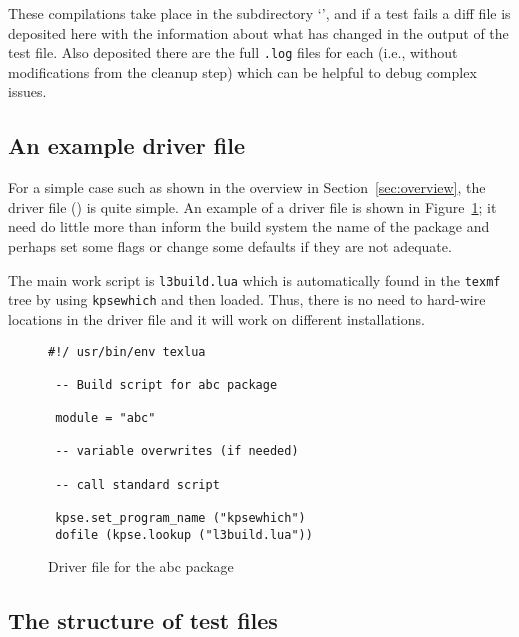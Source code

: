 \documentclass[a4paper]{ltugboat}
\begin{document}
These compilations take place in the subdirectory
`\texttt{\compdirname}', and if a test fails a diff file is deposited
here with the information about what has changed in the output of the
test file. Also deposited there are the full \texttt{.log} files  for each  (i.e., without modifications from the cleanup step) which can be helpful to debug complex issues.


\subsection{An example driver file}
\label{sec:example}

For a simple case such as shown in the overview in
Section~\ref{sec:overview}, the driver file (\texttt{\drivername}) is
quite simple.  An example of a driver file is shown in
Figure~\ref{fig:driver}; it need do little more than inform the build
system the name of the package and perhaps set some flags or change
some defaults if they are not adequate.

The main work script is \texttt{l3build.lua} which is automatically found in the
\texttt{texmf} tree by using \texttt{kpsewhich} and then loaded. 
Thus, there is no need to hard-wire locations in the driver file
and it will work on different installations.

\begin{figure}
\begin{Verbatim}[frame=single,fontsize=\small]
#!/ usr/bin/env texlua

 -- Build script for abc package

 module = "abc"

 -- variable overwrites (if needed)

 -- call standard script

 kpse.set_program_name ("kpsewhich")
 dofile (kpse.lookup ("l3build.lua")) 
\end{Verbatim}
\caption{Driver file for the \textsf{abc} package}
\label{fig:driver}
\end{figure}


\subsection{The structure of test files}
\end{document}
